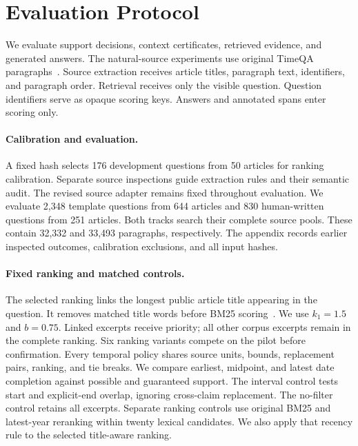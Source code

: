 \section{Evaluation Protocol}
\label{sec:protocol}

We evaluate support decisions, context certificates, retrieved evidence, and generated answers.
The natural-source experiments use original TimeQA paragraphs~\citep{chen2021timeqa}.
Source extraction receives article titles, paragraph text, identifiers, and paragraph order.
Retrieval receives only the visible question.
Question identifiers serve as opaque scoring keys.
Answers and annotated spans enter scoring only.

\paragraph{Calibration and evaluation.}
A fixed hash selects 176 development questions from 50 articles for ranking calibration.
Separate source inspections guide extraction rules and their semantic audit.
The revised source adapter remains fixed throughout evaluation.
We evaluate 2,348 template questions from 644 articles and 830 human-written questions from 251 articles.
Both tracks search their complete source pools.
These contain 32,332 and 33,493 paragraphs, respectively.
The appendix records earlier inspected outcomes, calibration exclusions, and all input hashes.

\paragraph{Fixed ranking and matched controls.}
The selected ranking links the longest public article title appearing in the question.
It removes matched title words before BM25 scoring~\citep{robertson1995bm25}.
We use $k_1=1.5$ and $b=0.75$.
Linked excerpts receive priority; all other corpus excerpts remain in the complete ranking.
Six ranking variants compete on the pilot before confirmation.
Every temporal policy shares source units, bounds, replacement pairs, ranking, and tie breaks.
We compare earliest, midpoint, and latest date completion against possible and guaranteed support.
The interval control tests start and explicit-end overlap, ignoring cross-claim replacement.
The no-filter control retains all excerpts.
Separate ranking controls use original BM25 and latest-year reranking within twenty lexical candidates.
We also apply that recency rule to the selected title-aware ranking.

